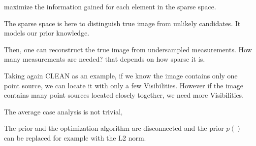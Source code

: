 maximize the information gained for each element in the sparse space.

The sparse space is here to distinguish true image from unlikely candidates. It models our prior knowledge.

Then, one can reconstruct the true image from undersampled measurements. How many measurements are needed? that depends on how sparse it is. 

Taking again CLEAN as an example, if we know the image contains only one point source, we can locate it with only a few Visibilities. However if the image contains many point sources located closely together, we need more Visibilities.

The average case analysis is not trivial, 

The prior and the optimization algorithm are disconnected and the prior $p()$ can be replaced for example with the L2 norm.








